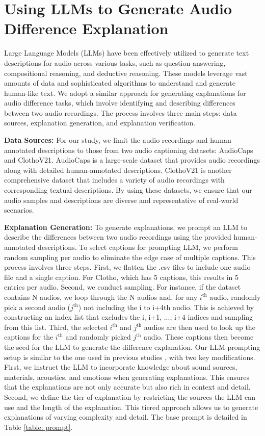\section{Using LLMs to Generate Audio Difference Explanation} \label{appendix: llm gen}  \vspace{-0.1in}

Large Language Models (LLMs) have been effectively utilized to generate text descriptions for audio across various tasks, such as question-answering, compositional reasoning, and deductive reasoning. These models leverage vast amounts of data and sophisticated algorithms to understand and generate human-like text. We adopt a similar approach for generating explanations for audio difference tasks, which involve identifying and describing differences between two audio recordings. The process involves three main steps: data sources, explanation generation, and explanation verification.

\textbf{Data Sources:} For our study, we limit the audio recordings and human-annotated descriptions to those from two audio captioning datasets: AudioCaps and ClothoV21. AudioCaps is a large-scale dataset that provides audio recordings along with detailed human-annotated descriptions. ClothoV21 is another comprehensive dataset that includes a variety of audio recordings with corresponding textual descriptions. By using these datasets, we ensure that our audio samples and descriptions are diverse and representative of real-world scenarios.

\textbf{Explanation Generation:} To generate explanations, we prompt an LLM to describe the differences between two audio recordings using the provided human-annotated descriptions. To select captions for prompting LLM, we perform random sampling per audio to eliminate the edge case of multiple captions. This process involves three steps. First, we flatten the .csv files to include one audio file and a single caption. For Clotho, which has 5 captions, this results in 5 entries per audio. Second, we conduct sampling. For instance, if the dataset contains N audios, we loop through the N audios and, for any $i^{\text{th}}$ audio, randomly pick a second audio ($j^{\text{th}}$) not including the i to i+4th audio. This is achieved by constructing an index list that excludes the i, i+1, ..., i+4 indices and sampling from this list. Third, the selected $i^{\text{th}}$ and $j^{\text{th}}$ audios are then used to look up the captions for the $i^{\text{th}}$ and randomly picked $j^{\text{th}}$ audio. These captions then become the seed for the LLM to generate the difference explanation. Our LLM prompting setup is similar to the one used in previous studies \cite{audioentail}, with two key modifications. First, we instruct the LLM to incorporate knowledge about sound sources, materials, acoustics, and emotions when generating explanations. This ensures that the explanations are not only accurate but also rich in context and detail. Second, we define the tier of explanation by restricting the sources the LLM can use and the length of the explanation. This tiered approach allows us to generate explanations of varying complexity and detail. The base prompt is detailed in Table \ref{table: prompt}.

